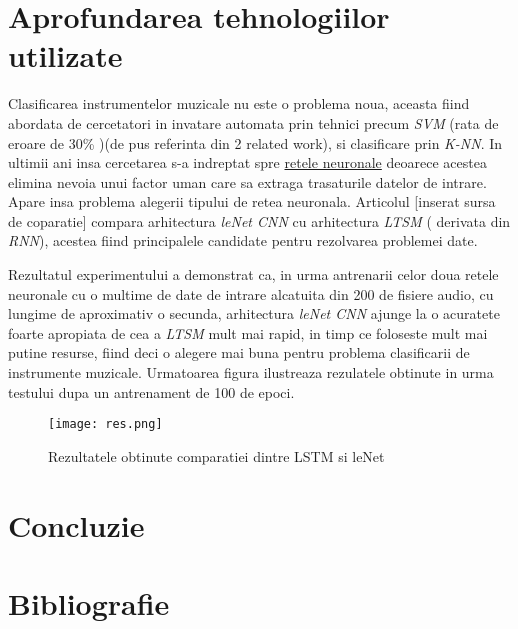 \documentclass[a4paper]{article}
\begin{document}
 \section {Aprofundarea tehnologiilor utilizate}
 Clasificarea instrumentelor muzicale nu este o problema noua, aceasta fiind abordata de cercetatori in invatare automata
prin tehnici precum \textit{SVM} (rata de eroare de 30\% )(de pus referinta din 2 related work), si clasificare prin \textit{K-NN}.
In ultimii ani insa cercetarea s-a indreptat spre \hyperref[NN]{retele neuronale} deoarece acestea elimina nevoia unui factor uman
care sa extraga trasaturile datelor de intrare. Apare insa problema alegerii tipului de retea neuronala. Articolul [inserat sursa
de coparatie] compara arhitectura \textit{ leNet CNN } cu arhitectura \textit{LTSM} ( derivata din \textit{RNN}), acestea fiind
principalele candidate pentru rezolvarea problemei date.


Rezultatul experimentului a demonstrat ca, in urma antrenarii celor doua retele neuronale cu o multime de date de intrare alcatuita
din 200 de fisiere audio, cu lungime de aproximativ o secunda, arhitectura \textit{leNet CNN} ajunge la o acuratete foarte
apropiata de cea a \textit{LTSM} mult mai rapid, in timp ce foloseste mult mai putine resurse, fiind deci o alegere mai buna
pentru problema clasificarii de instrumente muzicale. Urmatoarea figura ilustreaza rezulatele obtinute in urma testului dupa un
antrenament de 100 de epoci.

\begin{figure}[ht]
	\centering
	\texttt{[image: res.png]}
	\caption{Rezultatele obtinute comparatiei dintre LSTM si leNet}
\label{result1}
\end{figure}
\section{Concluzie}

\section{Bibliografie}
\end{document}
